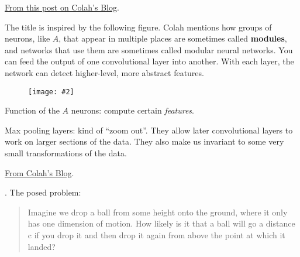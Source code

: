 \documentclass[11pt]{article}
\newcommand\myfig[2][0.3\textwidth]{\begin{figure}[h!]\centering\texttt{[image: \#2]}\end{figure}}
\newcommand\myspace[1][]{\vspace{#1\bigskipamount}}
\newcommand\p{\Needspace{10\baselineskip} \noindent}
\begin{document}
\label{Blogs}




\p \href{https://colah.github.io/posts/2014-07-Conv-Nets-Modular/}{From this post on Colah's Blog}. 

\myspace The title is inspired by the following figure. Colah mentions how groups of neurons, like $A$, that appear in multiple places are sometimes called \textbf{modules}, and networks that use them are sometimes called modular neural networks. You can feed the output of one convolutional layer into another. With each layer, the network can detect higher-level, more abstract features.
\myfig[0.3\textwidth]{ColahConv2.PNG}
\begin{compactitem}[$\longrightarrow$]
	\item Function of the $A$ neurons: compute certain \textit{features}.
	
	\item Max pooling layers: kind of ``zoom out''. They allow later convolutional layers to work on larger sections of the data. They also make us invariant to some very small transformations of the data.
\end{compactitem}





\p \href{https://colah.github.io/posts/2014-07-Understanding-Convolutions/}{From Colah's Blog}. 

\p {}. The posed problem:
\begin{footnotesize}
	\begin{quote}
		Imagine we drop a ball from some height onto the ground, where it only has one dimension of motion. How likely is it that a ball will go a distance c if you drop it and then drop it again from above the point at which it landed?
	\end{quote}
\end{footnotesize}
\end{document}
